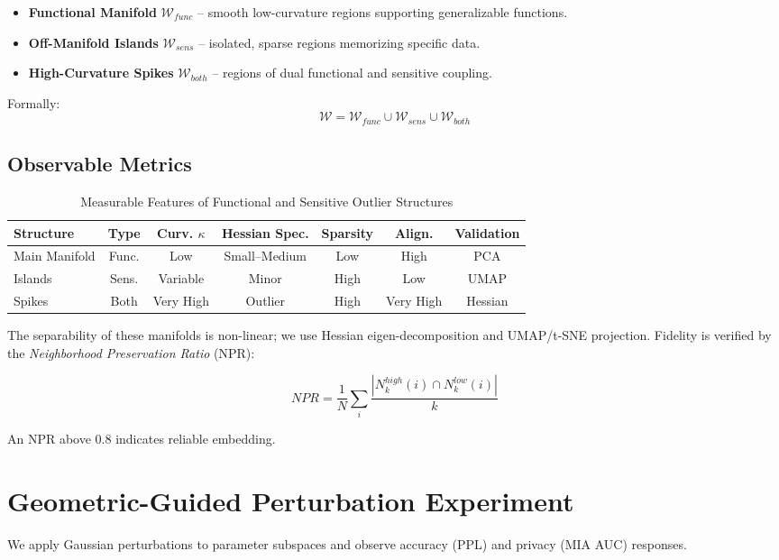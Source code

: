 \documentclass[letterpaper,twocolumn,10pt]{article}
\begin{document}
\begin{itemize}[leftmargin=2em]
  \item \textbf{Functional Manifold} $\mathcal{W}_{func}$ – smooth low-curvature regions supporting generalizable functions.
  \item \textbf{Off-Manifold Islands} $\mathcal{W}_{sens}$ – isolated, sparse regions memorizing specific data.
  \item \textbf{High-Curvature Spikes} $\mathcal{W}_{both}$ – regions of dual functional and sensitive coupling.
\end{itemize}

Formally:
\[
\mathcal{W} = \mathcal{W}_{func} \cup \mathcal{W}_{sens} \cup \mathcal{W}_{both}
\]

\subsection{Observable Metrics}

\begin{table}[h]
\centering
\caption{Measurable Features of Functional and Sensitive Outlier Structures}
\begin{tabular}{@{}lcccccc@{}}
\toprule
Structure & Type & Curv. $\kappa$ & Hessian Spec. & Sparsity & Align. & Validation \\ 
\midrule
Main Manifold & Func. & Low & Small–Medium & Low & High & PCA \\
Islands & Sens. & Variable & Minor & High & Low & UMAP \\
Spikes & Both & Very High & Outlier & High & Very High & Hessian \\
\bottomrule
\end{tabular}
\end{table}

The separability of these manifolds is non-linear; we use Hessian eigen-decomposition and 
UMAP/t-SNE projection. Fidelity is verified by the \emph{Neighborhood Preservation Ratio} (NPR):

\begin{equation}
NPR = \frac{1}{N}\sum_i \frac{|N_k^{high}(i) \cap N_k^{low}(i)|}{k}
\end{equation}

An NPR above 0.8 indicates reliable embedding.

\section{Geometric-Guided Perturbation Experiment}
We apply Gaussian perturbations to parameter subspaces and observe accuracy (PPL) and privacy (MIA AUC) responses.
\end{document}

